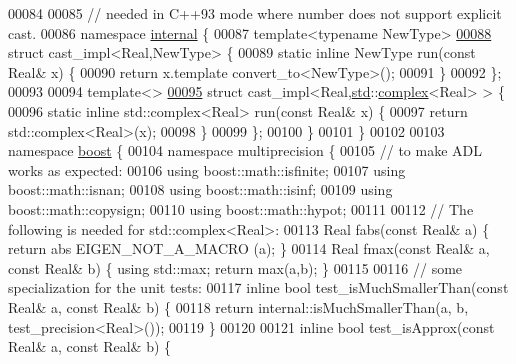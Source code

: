 \begin{DoxyCode}
00084 
00085   \textcolor{comment}{// needed in C++93 mode where number does not support explicit cast.}
00086   \textcolor{keyword}{namespace }\hyperlink{namespaceinternal}{internal} \{
00087     \textcolor{keyword}{template}<\textcolor{keyword}{typename} NewType>
\hyperlink{struct_eigen_1_1internal_1_1cast__impl_3_01_real_00_01_new_type_01_4}{00088}     \textcolor{keyword}{struct }cast\_impl<Real,NewType> \{
00089       \textcolor{keyword}{static} \textcolor{keyword}{inline} NewType run(\textcolor{keyword}{const} Real& x) \{
00090         \textcolor{keywordflow}{return} x.template convert\_to<NewType>();
00091       \}
00092     \};
00093 
00094     \textcolor{keyword}{template}<>
\hyperlink{struct_eigen_1_1internal_1_1cast__impl_3_01_real_00_01std_1_1complex_3_01_real_01_4_01_4}{00095}     \textcolor{keyword}{struct }cast\_impl<Real,\hyperlink{namespacestd}{std}::\hyperlink{structcomplex}{complex}<Real> > \{
00096       \textcolor{keyword}{static} \textcolor{keyword}{inline} std::complex<Real>  run(\textcolor{keyword}{const} Real& x) \{
00097         \textcolor{keywordflow}{return} std::complex<Real>(x);
00098       \}
00099     \};
00100   \}
00101 \}
00102 
00103 \textcolor{keyword}{namespace }\hyperlink{namespaceboost}{boost} \{
00104 \textcolor{keyword}{namespace }multiprecision \{
00105   \textcolor{comment}{// to make ADL works as expected:}
00106   \textcolor{keyword}{using} boost::math::isfinite;
00107   \textcolor{keyword}{using} boost::math::isnan;
00108   \textcolor{keyword}{using} boost::math::isinf;
00109   \textcolor{keyword}{using} boost::math::copysign;
00110   \textcolor{keyword}{using} boost::math::hypot;
00111 
00112   \textcolor{comment}{// The following is needed for std::complex<Real>:}
00113   Real fabs(\textcolor{keyword}{const} Real& a) \{ \textcolor{keywordflow}{return} abs EIGEN\_NOT\_A\_MACRO (a); \}
00114   Real fmax(\textcolor{keyword}{const} Real& a, \textcolor{keyword}{const} Real& b) \{ \textcolor{keyword}{using} std::max; \textcolor{keywordflow}{return} max(a,b); \}
00115 
00116   \textcolor{comment}{// some specialization for the unit tests:}
00117   \textcolor{keyword}{inline} \textcolor{keywordtype}{bool} test\_isMuchSmallerThan(\textcolor{keyword}{const} Real& a, \textcolor{keyword}{const} Real& b) \{
00118     \textcolor{keywordflow}{return} internal::isMuchSmallerThan(a, b, test\_precision<Real>());
00119   \}
00120 
00121   \textcolor{keyword}{inline} \textcolor{keywordtype}{bool} test\_isApprox(\textcolor{keyword}{const} Real& a, \textcolor{keyword}{const} Real& b) \{

\end{DoxyCode}
